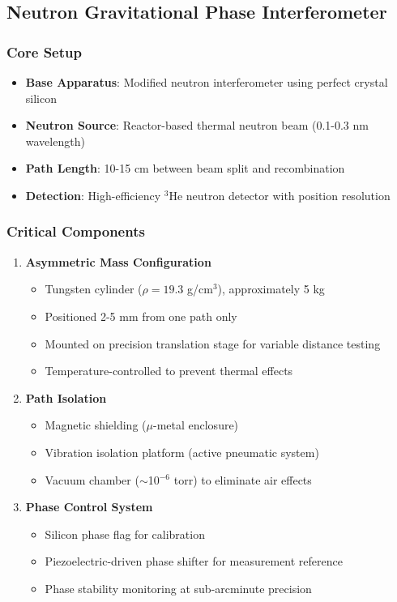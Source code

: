 \documentclass[12pt,a4paper]{article}
\begin{document}
\subsection{Neutron Gravitational Phase Interferometer}

\subsubsection{Core Setup}
\begin{itemize}
    \item \textbf{Base Apparatus}: Modified neutron interferometer using perfect crystal silicon
    \item \textbf{Neutron Source}: Reactor-based thermal neutron beam (0.1-0.3 nm wavelength)
    \item \textbf{Path Length}: 10-15 cm between beam split and recombination
    \item \textbf{Detection}: High-efficiency $^3$He neutron detector with position resolution
\end{itemize}

\subsubsection{Critical Components}
\begin{enumerate}
    \item \textbf{Asymmetric Mass Configuration}
    \begin{itemize}
        \item Tungsten cylinder ($\rho = 19.3$ g/cm$^3$), approximately 5 kg
        \item Positioned 2-5 mm from one path only
        \item Mounted on precision translation stage for variable distance testing
        \item Temperature-controlled to prevent thermal effects
    \end{itemize}

    \item \textbf{Path Isolation}
    \begin{itemize}
        \item Magnetic shielding ($\mu$-metal enclosure)
        \item Vibration isolation platform (active pneumatic system)
        \item Vacuum chamber ($\sim$10$^{-6}$ torr) to eliminate air effects
    \end{itemize}

    \item \textbf{Phase Control System}
    \begin{itemize}
        \item Silicon phase flag for calibration
        \item Piezoelectric-driven phase shifter for measurement reference
        \item Phase stability monitoring at sub-arcminute precision
    \end{itemize}
\end{enumerate}
\end{document}
